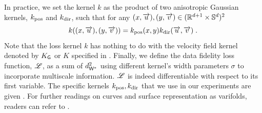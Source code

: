 In practice, we set the kernel $k$ as the product of two anisotropic Gaussian kernels, $k_{\mathrm{pos}}$ and $k_{\mathrm{dir}}$, 
such that for any $(x,\overrightarrow{u}),(y,\overrightarrow{v}) \in (\mathbb{R}^{d+1} \times \mathbb{S}^d)^2$
\begin{equation}
 k((x,\overrightarrow{u}),(y,\overrightarrow{v})) = k_{\mathrm{pos}}(x,y)k_{\mathrm{dir}}(\overrightarrow{u},\overrightarrow{v}) \;.
 \end{equation}
 Note that the loss kernel $k$ has nothing to do with the velocity field kernel denoted by $K_{\mathsf{G}}$ or $K$ specified in .
Finally, we define the data fidelity loss function, $\mathscr{L}$, as a sum of $ d_{\mathsf{W}^*}^2$ using different kernel's width parameters $\sigma$ to incorporate multiscale information. $\mathscr{L}$ is indeed differentiable with respect to its first variable.
The specific kernels $k_{\mathrm{pos}},k_{\mathrm{dir}}$ that we use in our experiments are given .
For further readings on curves and surface representation as varifolds, readers can refer to \cite{kaltenmark2017general,charon2013varifold}. 

 



